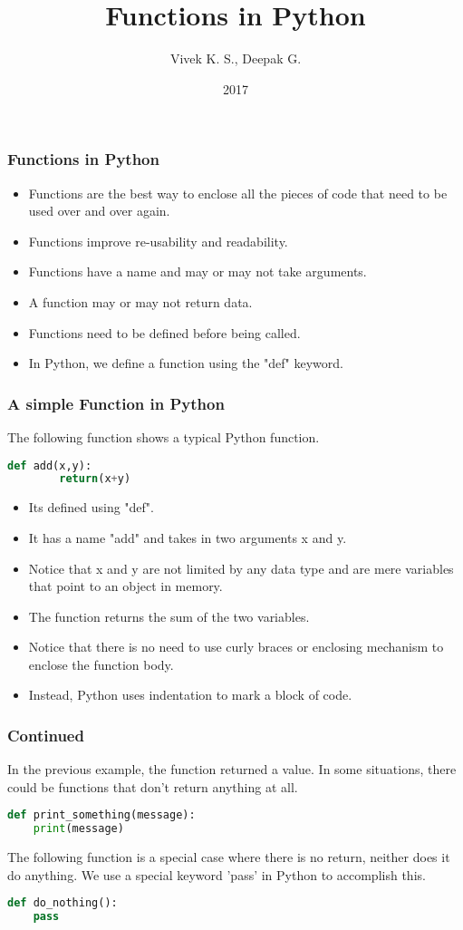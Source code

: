 \documentclass{beamer}
\title{Functions in Python}
\author{Vivek K. S., Deepak G.}
\institute{Information Systems Decision Sciences (ISDS)\\
MUMA College of Business\\
University of South Florida \\
Tampa, Florida}
\date{2017}
\begin{document}
\frame{\titlepage}

\begin{frame}
\frametitle{Functions in Python}
\begin{itemize}
\item Functions are the best way to enclose all the pieces of code that need to be used over and over again.
\item Functions improve re-usability and readability.
\item Functions have a name and may or may not take arguments.
\item A function may or may not return data.
\item Functions need to be defined before being called.
\item In Python, we define a function using the "def" keyword.
\end{itemize}
\end{frame}

\begin{frame}[fragile]
\frametitle{A simple Function in Python}
The following function shows a typical Python function.
\begin{lstlisting}[language=Python]
	def add(x,y):
		return(x+y)
\end{lstlisting}
\begin{itemize}
\item Its defined using "def".
\item It has a name "add" and takes in two arguments x and y.
\item Notice that x and y are not limited by any data type and are mere variables that point to an object in memory.
\item The function returns the sum of the two variables.
\item Notice that there is no need to use curly braces or enclosing mechanism to enclose the function body.
\item Instead, Python uses indentation to mark a block of code.
\end{itemize}

\end{frame}

\begin{frame}[fragile]
\frametitle{Continued}
In the previous example, the function returned a value. In some situations, there could be functions that don't return anything at all.
\begin{lstlisting}[language=Python]
def print_something(message):
	print(message)
\end{lstlisting}

The following function is a special case where there is no return, neither does it do anything. We use a special keyword 'pass' in Python to accomplish this.
\begin{lstlisting}[language=Python]
def do_nothing():
	pass
\end{lstlisting}
\end{frame}
\end{document}
